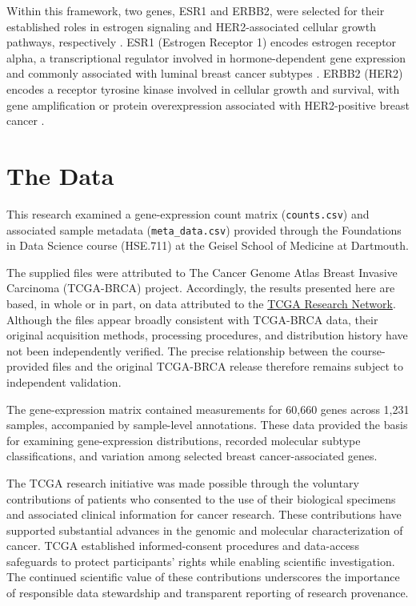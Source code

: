 \documentclass[12pt,letterpaper]{article}
\begin{document}
Within this framework, two genes, ESR1 and ERBB2, were selected for their established roles in estrogen signaling and HER2-associated cellular growth pathways, respectively \parencite{tcga2012}. ESR1 (Estrogen Receptor 1) encodes estrogen receptor alpha, a transcriptional regulator involved in hormone-dependent gene expression and commonly associated with luminal breast cancer subtypes \parencite{parker2009}. ERBB2 (HER2) encodes a receptor tyrosine kinase involved in cellular growth and survival, with gene amplification or protein overexpression associated with HER2-positive breast cancer \parencite{tcga2012}.



\section*{The Data}


This research examined a gene-expression count matrix (\texttt{counts.csv}) and associated sample metadata (\texttt{meta\_data.csv}) provided through the Foundations in Data Science course (HSE.711) at the Geisel School of Medicine at Dartmouth.

The supplied files were attributed to The Cancer Genome Atlas Breast Invasive Carcinoma (TCGA-BRCA) project. Accordingly, the results presented here are based, in whole or in part, on data attributed to the \href{https://www.cancer.gov/tcga}{TCGA Research Network}. Although the files appear broadly consistent with TCGA-BRCA data, their original acquisition methods, processing procedures, and distribution history have not been independently verified. The precise relationship between the course-provided files and the original TCGA-BRCA release therefore remains subject to independent validation.

The gene-expression matrix contained measurements for 60,660 genes across 1,231 samples, accompanied by sample-level annotations. These data provided the basis for examining gene-expression distributions, recorded molecular subtype classifications, and variation among selected breast cancer-associated genes.

The TCGA research initiative was made possible through the voluntary contributions of patients who consented to the use of their biological specimens and associated clinical information for cancer research. These contributions have supported substantial advances in the genomic and molecular characterization of cancer. TCGA established informed-consent procedures and data-access safeguards to protect participants' rights while enabling scientific investigation. The continued scientific value of these contributions underscores the importance of responsible data stewardship and transparent reporting of research provenance.
\end{document}
